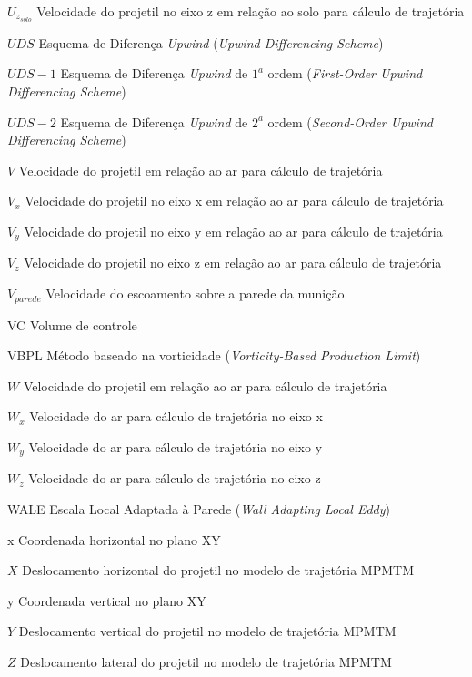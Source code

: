 \begin{siglas}
    \item[\(U_{z_{solo}}\)] Velocidade do projetil no eixo z em relação ao solo para cálculo de trajetória
    \item[\(UDS\)] Esquema de Diferença \textit{Upwind} (\textit{Upwind Differencing Scheme})
    \item[\(UDS-1\)] Esquema de Diferença \textit{Upwind} de $1^a$ ordem (\textit{First-Order Upwind Differencing Scheme})
    \item[\(UDS-2\)] Esquema de Diferença \textit{Upwind} de $2^a$ ordem (\textit{Second-Order Upwind Differencing Scheme})
    \item[\(V\)] Velocidade do projetil em relação ao ar para cálculo de trajetória
    \item[\(V_x\)] Velocidade do projetil no eixo x em relação ao ar para cálculo de trajetória
    \item[\(V_y\)] Velocidade do projetil no eixo y em relação ao ar para cálculo de trajetória
    \item[\(V_z\)] Velocidade do projetil no eixo z em relação ao ar para cálculo de trajetória
    \item[\(V_{parede}\)] Velocidade do escoamento sobre a parede da munição
    \item[VC] Volume de controle
    \item[VBPL] Método baseado na vorticidade (\textit{Vorticity-Based Production Limit})
    \item[\(W\)] Velocidade do projetil em relação ao ar para cálculo de trajetória
    \item[\(W_x\)] Velocidade do ar para cálculo de trajetória no eixo x
    \item[\(W_y\)] Velocidade do ar para cálculo de trajetória no eixo y
    \item[\(W_z\)] Velocidade do ar para cálculo de trajetória no eixo z
    \item[WALE] Escala Local Adaptada à Parede (\textit{Wall Adapting Local Eddy})
    \item[x] Coordenada horizontal no plano XY
    \item[\(X\)] Deslocamento horizontal do projetil no modelo de trajetória MPMTM
    \item[y] Coordenada vertical no plano XY
    \item[\(Y\)] Deslocamento vertical do projetil no modelo de trajetória MPMTM
    \item[\(Z\)] Deslocamento lateral do projetil no modelo de trajetória MPMTM
\end{siglas}


